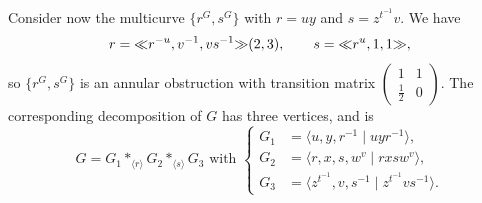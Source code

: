 \documentclass{amsart}
\begin{document}
Consider now the multicurve $\{r^G,s^G\}$ with $r=u y$ and
$s=z^{t^{-1}}v$. We have
\[r={\ll}r^{-u},v^{-1},vs^{-1}{\gg}(2,3),\qquad s={\ll}r^u,1,1{\gg},\]
so
$\{r^G,s^G\}$ is an annular obstruction with transition matrix
$(\begin{smallmatrix}1&1\\\frac12&0\end{smallmatrix})$. The
corresponding decomposition of $G$ has three vertices, and is
\[G=G_1*_{\langle r\rangle}G_2*_{\langle s\rangle} G_3\text{ with }\begin{cases}
  G_1 &= \langle u,y,r^{-1}\mid u y r^{-1}\rangle,\\
  G_2 &= \langle r,x,s,w^v\mid r x s w^v\rangle,\\
  G_3 &= \langle z^{t^{-1}},v,s^{-1}\mid z^{t^{-1}}vs^{-1}\rangle.
\end{cases}\]
\end{document}
